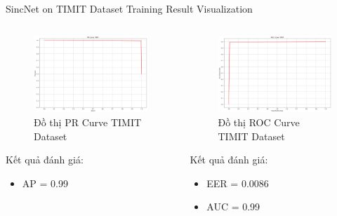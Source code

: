 \documentclass[notheorems, aspectratio=54]{beamer}
\begin{document}
\begin{frame}{SincNet on TIMIT Dataset Training Result Visualization}
	\begin{columns}
		\begin{column}{0.47\textwidth}
			\begin{figure}[H]
				\includegraphics[width=0.9\linewidth]{result/pr_curve_timit.png}
				\caption{Đồ thị PR Curve TIMIT Dataset}
			\end{figure}
			Kết quả đánh giá:
			\begin{itemize}
				\item AP = 0.99
			\end{itemize}
		\end{column}
		\begin{column}{0.5\textwidth}
			\begin{figure}[H]
				\includegraphics[width=0.9\linewidth]{result/roc_curve_timit.png}
				\caption{Đồ thị ROC Curve TIMIT Dataset}
			\end{figure}
			Kết quả đánh giá:
			\begin{itemize}
				\item EER = 0.0086
				\item AUC = 0.99
			\end{itemize}
		\end{column}
	\end{columns}
\end{frame}
\end{document}
